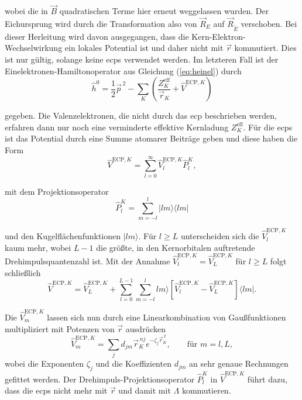	wobei die in $\vec{B}$ quadratischen Terme hier erneut weggelassen wurden. Der Eichursprung wird durch die Transformation also von $\vec{R}_E$ auf $\vec{R}_{\tilde{E}}$ verschoben. Bei dieser Herleitung wird davon ausgegangen, dass die Kern-Elektron-Wechselwirkung ein lokales Potential ist und daher nicht mit $\vec{r}$ kommutiert. Dies ist nur gültig, solange keine \acp{ecp} verwendet werden. Im letzteren Fall ist der Einelektronen-Hamiltonoperator aus Gleichung (\ref{eq:heinel}) durch	
	\begin{equation}
	\hat{h}^0=\frac{1}{2}\vec{p}^{\,2}-\sum_K \left(\frac{Z_K^{\textrm{eff}}}{\vec{r}_K}+\hat{V}^{\textrm{ECP},K}\right)
	\end{equation}
	
	gegeben. Die Valenzelektronen, die nicht durch das \ac{ecp} beschrieben werden, erfahren dann nur noch eine verminderte effektive Kernladung $Z_K^{\textrm{eff}}$. Für die \acp{ecp} ist das Potential durch eine Summe atomarer Beiträge geben und diese haben die Form\supercite{mcmurchie1981calculation,cao2010relativistic}
	\begin{equation}\label{eq:ecpotential}
	\hat{V}^{\textrm{ECP},K}=\sum_{l=0}^{\infty}\hat{V}^{\textrm{ECP},K}_l\hat{P}_l^K,
	\end{equation}
	
	mit dem Projektionsoperator
	\begin{equation}
	\hat{P}_l^K=\sum_{m=-l}^l\vert lm\rangle\langle lm\vert
	\end{equation}
	
	und den Kugelflächenfunktionen $\vert lm\rangle$. Für $l\geq L$ unterscheiden sich die $\hat{V}^{\textrm{ECP},K}_l$ kaum mehr, wobei $L-1$ die größte, in den Kernorbitalen auftretende Drehimpulsquantenzahl ist. Mit der Annahme $\hat{V}^{\textrm{ECP},K}_l=\hat{V}^{\textrm{ECP},K}_L$ für $l\geq L$ folgt schließlich\supercite{kahn1972ab}
	\begin{equation}
	\hat{V}^{\textrm{ECP},K}=\hat{V}^{\textrm{ECP},K}_{L}+\sum_{l=0}^{L-1}\sum_{m=-l}^l lm\rangle\left[\hat{V}^{\textrm{ECP},K}_{l}-\hat{V}^{\textrm{ECP},K}_{L}\right]\langle lm\vert .
	\end{equation}
	
	Die $\hat{V}^{\textrm{ECP},K}_{m}$ lassen sich nun durch eine Linearkombination von Gaußfunktionen multipliziert mit Potenzen von $\vec{r}$ ausdrücken\supercite{kahn1972ab}
	\begin{equation}
	\hat{V}^{\textrm{ECP},K}_{m}=\sum_jd_{jm}\vec{r}_K^{\,nj}e^{-\zeta_j\vec{r}_K^{\,2}}, \qquad \textrm{für } m=l,L,
	\end{equation}
	wobei die Exponenten $\zeta_j$ und die Koeffizienten $d_{jm}$ an sehr genaue Rechnungen gefittet werden. Der Drehimpuls-Projektionsoperator $\hat{P}_l^K$ in $\hat{V}^{\textrm{ECP},K}$ führt dazu, dass die \acp{ecp} nicht mehr mit $\vec{r}$ und damit mit $\Lambda$ kommutieren. 
	
